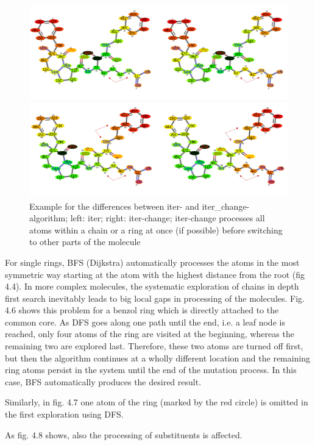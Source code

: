 \begin{figure}
\includegraphics[scale=0.3]{iter_iter_change_1a5g_1}

\includegraphics[scale=0.3]{iter_iter_change_1a5g_2}\caption{Example for the differences between iter- and iter\_change-algorithm;
left: iter; right: iter-change; iter-change processes all atoms within
a chain or a ring at once (if possible) before switching to other
parts of the molecule}
\end{figure}

For single rings, BFS (Dijkstra) automatically processes the atoms in the most symmetric way starting at the atom with the highest distance from the root (fig 4.4).
In more complex molecules, the systematic exploration of chains in
depth first search inevitably leads to big local gaps in processing
of the molecules. Fig. 4.6 shows this problem for a benzol ring which
is directly attached to the common core. As DFS goes along one path
until the end, i.e. a leaf node is reached, only four atoms of the
ring are visited at the beginning, whereas the remaining two are explored
last. Therefore, these two atoms are turned off first, but then the
algorithm continues at a wholly different location and the remaining
ring atoms persist in the system until the end of the mutation process.
In this case, BFS automatically produces the desired result. 

Similarly, in fig. 4.7 one atom of the ring (marked by the red circle)
is omitted in the first exploration using DFS.

As fig. 4.8 shows, also the processing of substituents is affected.

